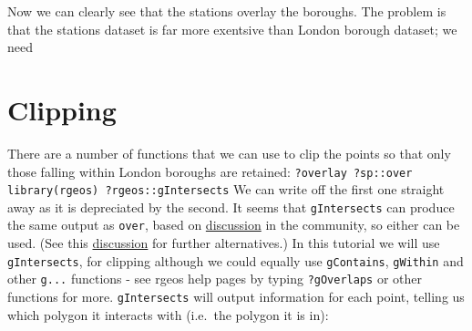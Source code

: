 \documentclass[]{article}
\begin{document}
Now we can clearly see that the stations overlay the boroughs. The
problem is that the stations dataset is far more exentsive than London
borough dataset; we need

\section{Clipping}

There are a number of functions that we can use to clip the points so
that only those falling within London boroughs are retained:
\texttt{?overlay ?sp::over library(rgeos) ?rgeos::gIntersects} We can
write off the first one straight away as it is depreciated by the
second. It seems that \texttt{gIntersects} can produce the same output
as \texttt{over}, based on
\href{http://gis.stackexchange.com/questions/63793/how-to-overlay-a-polygon-over-spatialpointsdataframe-and-preserving-the-spdf-dat}{discussion}
in the community, so either can be used. (See this
\href{http://stackoverflow.com/questions/15881455/how-to-clip-worldmap-with-polygon-in-r}{discussion}
for further alternatives.) In this tutorial we will use
\texttt{gIntersects}, for clipping although we could equally use
\texttt{gContains}, \texttt{gWithin} and other \texttt{g...} functions -
see rgeos help pages by typing \texttt{?gOverlaps} or other functions
for more. \texttt{gIntersects} will output information for each point,
telling us which polygon it interacts with (i.e.~the polygon it is in):
\end{document}
